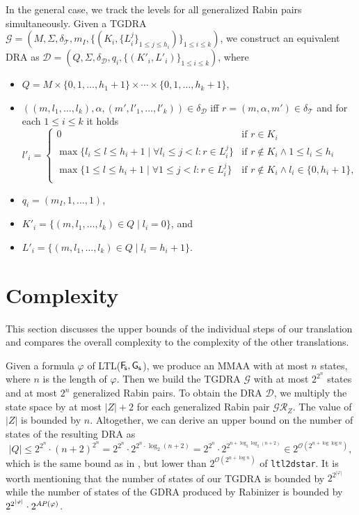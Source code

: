 \documentclass{llncs}
\newcommand{\AP}{\mathit{A\hskip-0.1ex P}}
\newcommand{\mD}{\mathcal{D}}
\newcommand{\mG}{\mathcal{G}}
\newcommand{\mGR}{\mathcal{GR}}
\newcommand{\mT}{\mathcal{T}}
\newcommand{\mO}{\mathcal{O}}
\begin{document}
In the general case, we track the levels for all generalized Rabin pairs
simultaneously. Given a TGDRA
$\mG=(M,\Sigma,\delta_\mT,m_I,\{(K_i,\{L_i^j\}_{1\leq j\leq h_i})\}_{1\leq i
  \leq k})$, we construct an equivalent DRA as $\mD=(Q,\Sigma,
\delta_{\mD},q_i,\{(K'_i,L'_i)\}_{1\leq i \leq k})$, where
\begin{itemize}
\item $Q=M \times \{0,1,\ldots,h_1{+}1\} \times \cdots 
\times \{0,1,\ldots,h_k{+}1\}$,
\item $((m,l_1,\ldots,l_k),\alpha,(m',l'_1,\ldots,l'_k)) \in \delta_\mD$ 
iff $r=(m,\alpha,m') \in \delta_\mT$ and for each $1\leq i \leq k$ it holds
$$l'_i = \begin{cases}
0 &\text{if }r\in K_i \\
\max\{l_i \leq l \leq h_i{+}1 \mid \forall l_i \leq j < l:r\in L_i^j\} &\text{if }r \notin K_i \land 1 \leq l_i \leq h_i \\
\max\{1 \leq l \leq h_i{+}1 \mid \forall 1 \leq j < l:r\in L_i^j\} &\text{if }r\notin K_i\land l_i \in \{0,h_i{+}1\}\text{,} \\
\end{cases}$$
\item $q_i = (m_I,1,\ldots,1)$,
\item $K'_i= \{(m,l_1,\ldots,l_k)\in Q \mid l_i=0\}$, and
\item $L'_i= \{(m,l_1,\ldots,l_k)\in Q \mid l_i=h_i+1\}$.
\end{itemize}



\section{Complexity}

This section discusses the upper bounds of the individual steps of our
translation and compares the overall complexity to the complexity of the
other translations.

Given a formula $\varphi$ of LTL(${\mathsf{F}\!_\mathsf{s}},{\mathsf{G}_\mathsf{s}}$), we produce an MMAA with
at most $n$ states, where $n$ is the length of $\varphi$.  Then we build the
TGDRA $\mG$ with at most $2^{2^{n}}$ states and at most $2^n$ generalized
Rabin pairs.  To obtain the DRA $\mD$, we multiply the state space by at
most $|Z|+2$ for each generalized Rabin pair $\mGR_Z$.  The value of $|Z|$
is bounded by $n$. Altogether, we can derive an upper bound on the number of
states of the resulting DRA as
$$
|Q| \leq 
2^{2^{n}} \cdot (n+2)^{2^{n}} =
2^{2^{n}} \cdot 2^{{2^n}\cdot\log_2{(n+2)}} = 
2^{2^{n}} \cdot 2^{2^{n+\log_2\log_2(n+2)}} \in
2^{\mO(2^{n+\log \log n})},
$$
which is the same bound as in \cite{KE12}, but lower than $2^{\mO(2^{n+\log
    n})}$ of \texttt{ltl2dstar}.  It is worth mentioning that the number of
states of our TGDRA is bounded by $2^{2^{|\varphi|}}$ while the number of
states of the GDRA produced by Rabinizer is bounded by
$2^{2^{|\varphi|}}\cdot 2^{\AP(\varphi)}$. 
\end{document}
